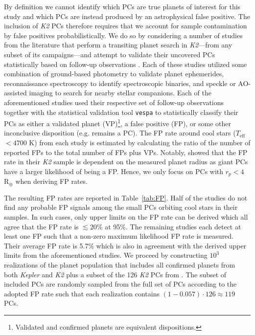 \documentclass[twocolumn]{emulateapj}
\newcommand{\kepler}[1]{\emph{Kepler}#1}
\newcommand{\ktwo}[1]{\emph{K2}#1}
\newcommand{\teff}[1]{$T_{\text{eff}}$#1}
\begin{document}
By definition we cannot identify which PCs are true planets of interest for this study and
which PCs are instead produced by an astrophysical false positive. 
The inclusion of \ktwo{} PCs therefore requires that we account for sample contamination by false positives
probabilistically. We do so by considering
a number of studies from the literature that perform a transiting planet search in \ktwo{---}from any subset of its
campaigns---and attempt to validate their uncovered PCs statistically based on follow-up observations
\citep{montet15,crossfield16b,dressing17,hirano18,livingston18a,mayo18}. Each of these studies utilized some combination of
ground-based photometry to validate planet ephemerides, reconnaissance
spectroscopy to identify spectroscopic binaries, and speckle or AO-assisted imaging to search for nearby stellar companions.
Each of the aforementioned studies used their respective set of follow-up observations together with the
statistical validation tool \texttt{vespa} \citep{morton12,morton15} to statistically classify their PCs as either a validated
planet (VP)\footnote{Validated and confirmed planets are equivalent dispositions.},
a false positive (FP), or some other inconclusive disposition (e.g. remains a PC). The FP rate around cool
stars (\teff{} $< 4700$ K) from each study is estimated by calculating the ratio of the number of reported FPs to
the total number of FPs plus VPs. Notably, \cite{crossfield16b} showed that the FP rate in their \ktwo{} sample is dependent
on the measured planet radius as giant PCs have a larger likelihood of
being a FP. Hence, we only focus on PCs with $r_p<4$ R$_{\oplus}$ when deriving FP rates.

The resulting FP rates are reported in Table~\ref{tab:FP}. Half of the studies do not find any probable
FP signals among the small PCs orbiting cool stars in their samples. In such cases, only upper limits on the FP rate
can be derived which all agree that the FP rate is $\lesssim 20$\% at 95\%. The remaining studies
each detect at least one FP such that a non-zero maximum likelihood FP rate is measured. Their average FP rate is 5.7\%
which is also in agreement with the derived upper limits from the aforementioned studies.
We proceed by constructing $10^3$ realizations of the planet population
that includes all confirmed planets from both \kepler{} and \ktwo{} plus a subset of the 126 \ktwo{} PCs from
\cite{kruse19}. The subset of included PCs are randomly sampled from the full set of PCs
according to the adopted FP rate such that each realization contains $(1-0.057)\cdot 126 \approx 119$ PCs.
\end{document}
